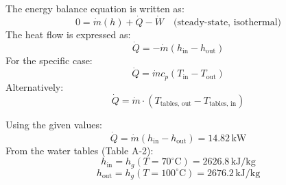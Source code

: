 The energy balance equation is written as:  
\[
0 = \dot{m}(h) + \dot{Q} - \dot{W} \quad \text{(steady-state, isothermal)}
\]  
The heat flow is expressed as:  
\[
\dot{Q} = -\dot{m}(h_{\text{in}} - h_{\text{out}})
\]  
For the specific case:  
\[
\dot{Q} = \dot{m} c_p (T_{\text{in}} - T_{\text{out}})
\]  
Alternatively:  
\[
\dot{Q} = \dot{m} \cdot (T_{\text{tables, out}} - T_{\text{tables, in}})
\]  

Using the given values:  
\[
\dot{Q} = \dot{m}(h_{\text{in}} - h_{\text{out}}) = 14.82 \, \text{kW}
\]  
From the water tables (Table A-2):  
\[
h_{\text{in}} = h_g(T = 70^\circ\text{C}) = 2626.8 \, \text{kJ/kg}
\]  
\[
h_{\text{out}} = h_g(T = 100^\circ\text{C}) = 2676.2 \, \text{kJ/kg}
\]